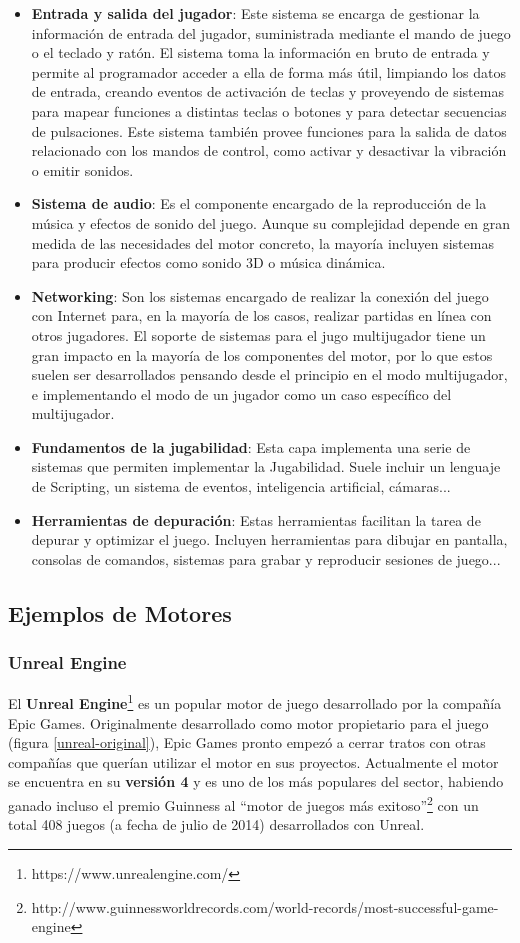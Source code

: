 \begin{itemize}
\item\textbf{Entrada y salida del jugador}: Este sistema se encarga de gestionar la información de entrada del jugador, suministrada mediante el mando de juego o el teclado y ratón. El sistema toma la información en bruto de entrada y permite al programador acceder a ella de forma más útil, limpiando los datos de entrada, creando eventos de activación de teclas y proveyendo de sistemas para mapear funciones a distintas teclas o botones y para detectar secuencias de pulsaciones. Este sistema también provee funciones para la salida de datos relacionado con los mandos de control, como activar y desactivar la vibración o emitir sonidos.
\item\textbf{Sistema de audio}: Es el componente encargado de la reproducción de la música y efectos de sonido del juego. Aunque su complejidad depende en gran medida de las necesidades del motor concreto, la mayoría incluyen sistemas para producir efectos como sonido 3D o música dinámica.
\item\textbf{Networking}: Son los sistemas encargado de realizar la conexión del juego con Internet para, en la mayoría de los casos, realizar partidas en línea con otros jugadores. El soporte de sistemas para el jugo multijugador tiene un gran impacto en la mayoría de los componentes del motor, por lo que estos suelen ser desarrollados pensando desde el principio en el modo multijugador, e implementando el modo de un jugador como un caso específico del multijugador.
\item\textbf{Fundamentos de la jugabilidad}: Esta capa implementa una serie de sistemas que permiten implementar la Jugabilidad. Suele incluir un lenguaje de Scripting, un sistema de eventos, inteligencia artificial, cámaras...
\item\textbf{Herramientas de depuración}: Estas herramientas facilitan la tarea de depurar y optimizar el juego. Incluyen herramientas para dibujar en pantalla, consolas de comandos, sistemas para grabar y reproducir sesiones de juego...
\end{itemize}

\subsection{Ejemplos de Motores}
\subsubsection{Unreal Engine}
El \textbf{Unreal Engine}\footnote{https://www.unrealengine.com/} es un popular motor de juego desarrollado por la compañía Epic Games. Originalmente desarrollado como motor propietario para el juego  (figura \ref{unreal-original}), Epic Games pronto empezó a cerrar tratos con otras compañías que querían utilizar el motor en sus proyectos. Actualmente el motor se encuentra en su \textbf{versión 4} y es uno de los más populares del sector, habiendo ganado incluso el premio Guinness al ``motor de juegos más exitoso''\footnote{http://www.guinnessworldrecords.com/world-records/most-successful-game-engine} con un total 408 juegos (a fecha de julio de 2014) desarrollados con Unreal. 

